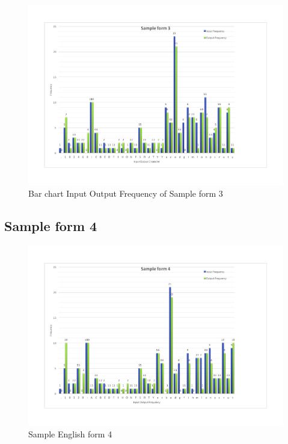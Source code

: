 \begin{figure}[H]
\centering
\includegraphics[width=1\textwidth]{form3.pdf}
\caption {Bar chart Input Output Frequency of Sample form 3}
\label {fig:bar3}
\end{figure}


\subsection{Sample form 4}

\begin{figure}[H]
\centering
\includegraphics[width=1\textwidth]{form4}
\caption {Sample English form 4}
\label {fig:form4}
\end{figure}

